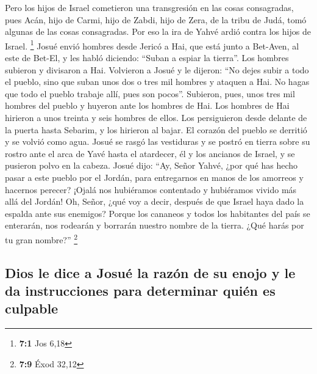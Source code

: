  Pero los hijos de Israel cometieron una transgresión en
las cosas consagradas, pues Acán, hijo de Carmi, hijo de Zabdi, hijo de
Zera, de la tribu de Judá, tomó algunas de las cosas consagradas. Por
eso la ira de Yahvé ardió contra los hijos de Israel. \footnote{\textbf{7:1}
  Jos 6,18}  Josué envió hombres desde Jericó a Hai, que
está junto a Bet-Aven, al este de Bet-El, y les habló diciendo: ``Suban
a espiar la tierra''. Los hombres subieron y divisaron a Hai.
 Volvieron a Josué y le dijeron: ``No dejes subir a todo
el pueblo, sino que suban unos dos o tres mil hombres y ataquen a Hai.
No hagas que todo el pueblo trabaje allí, pues son pocos''.
 Subieron, pues, unos tres mil hombres del pueblo y
huyeron ante los hombres de Hai.  Los hombres de Hai
hirieron a unos treinta y seis hombres de ellos. Los persiguieron desde
delante de la puerta hasta Sebarim, y los hirieron al bajar. El corazón
del pueblo se derritió y se volvió como agua.  Josué se
rasgó las vestiduras y se postró en tierra sobre su rostro ante el arca
de Yavé hasta el atardecer, él y los ancianos de Israel, y se pusieron
polvo en la cabeza.  Josué dijo: ``Ay, Señor Yahvé, ¿por
qué has hecho pasar a este pueblo por el Jordán, para entregarnos en
manos de los amorreos y hacernos perecer? ¡Ojalá nos hubiéramos
contentado y hubiéramos vivido más allá del Jordán!  Oh,
Señor, ¿qué voy a decir, después de que Israel haya dado la espalda ante
sus enemigos?  Porque los cananeos y todos los habitantes
del país se enterarán, nos rodearán y borrarán nuestro nombre de la
tierra. ¿Qué harás por tu gran nombre?'' \footnote{\textbf{7:9} Éxod
  32,12}

\hypertarget{dios-le-dice-a-josuuxe9-la-razuxf3n-de-su-enojo-y-le-da-instrucciones-para-determinar-quiuxe9n-es-culpable}{%
\subsection{Dios le dice a Josué la razón de su enojo y le da
instrucciones para determinar quién es
culpable}\label{dios-le-dice-a-josuuxe9-la-razuxf3n-de-su-enojo-y-le-da-instrucciones-para-determinar-quiuxe9n-es-culpable}}

